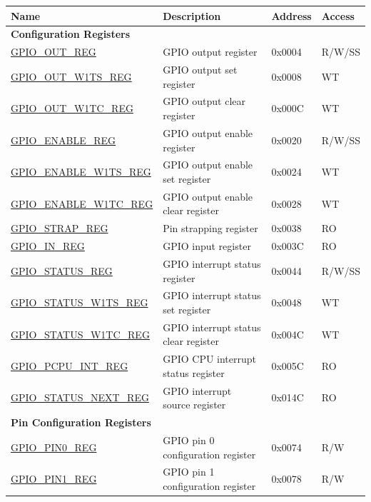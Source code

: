 \begin{longtable}{ | p{6cm} | p{7.2cm} | p{1.3cm} | p{1cm} | }
\hline\rowcolor{lightgray}
Name & Description &  Address & Access \\ \hline
\endhead
\multicolumn{4}{|l|}{\textbf{Configuration Registers}} \\ \hline
\hyperref[regdesc:GPIOOUTREG]{GPIO\_OUT\_REG} & GPIO output register & 0x0004 & R/W/SS \\ \hline
\hyperref[regdesc:GPIOOUTW1TSREG]{GPIO\_OUT\_W1TS\_REG} & GPIO output set register & 0x0008 & WT \\ \hline
\hyperref[regdesc:GPIOOUTW1TCREG]{GPIO\_OUT\_W1TC\_REG} & GPIO output clear register & 0x000C & WT \\ \hline
\hyperref[regdesc:GPIOENABLEREG]{GPIO\_ENABLE\_REG} & GPIO output enable register & 0x0020 & R/W/SS \\ \hline
\hyperref[regdesc:GPIOENABLEW1TSREG]{GPIO\_ENABLE\_W1TS\_REG} & GPIO output enable set register & 0x0024 & WT \\ \hline
\hyperref[regdesc:GPIOENABLEW1TCREG]{GPIO\_ENABLE\_W1TC\_REG} & GPIO output enable clear register & 0x0028 & WT \\ \hline
\hyperref[regdesc:GPIOSTRAPREG]{GPIO\_STRAP\_REG} & Pin strapping register & 0x0038 & RO \\ \hline
\hyperref[regdesc:GPIOINREG]{GPIO\_IN\_REG} & GPIO input register & 0x003C & RO \\ \hline
\hyperref[regdesc:GPIOSTATUSREG]{GPIO\_STATUS\_REG} & GPIO interrupt status register & 0x0044 & R/W/SS \\ \hline
\hyperref[regdesc:GPIOSTATUSW1TSREG]{GPIO\_STATUS\_W1TS\_REG} & GPIO interrupt status set register & 0x0048 & WT \\ \hline
\hyperref[regdesc:GPIOSTATUSW1TCREG]{GPIO\_STATUS\_W1TC\_REG} & GPIO interrupt status clear register & 0x004C & WT \\ \hline
\hyperref[regdesc:GPIOPCPUINTREG]{GPIO\_PCPU\_INT\_REG} & GPIO CPU interrupt status register & 0x005C & RO \\ \hline
\hyperref[regdesc:GPIOSTATUSNEXTREG]{GPIO\_STATUS\_NEXT\_REG} & GPIO interrupt source register & 0x014C & RO \\ \hline
\multicolumn{4}{|l|}{\textbf{Pin Configuration Registers}} \\ \hline
\hyperref[regdesc:GPIOPINNREG]{GPIO\_PIN0\_REG} & GPIO pin 0 configuration register & 0x0074 & R/W \\ \hline
\hyperref[regdesc:GPIOPINNREG]{GPIO\_PIN1\_REG} & GPIO pin 1 configuration register & 0x0078 & R/W \\ \hline

\end{longtable}

